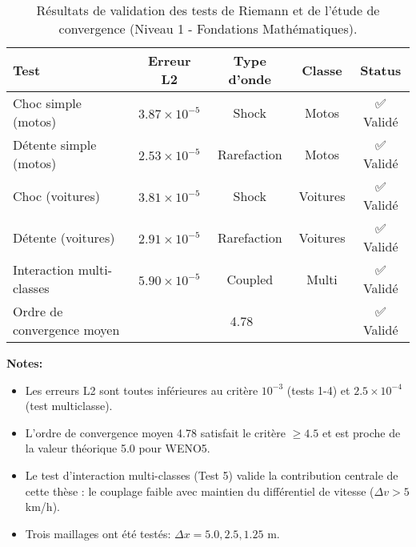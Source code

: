 
\begin{table}[h!]
\centering
\caption{Résultats de validation des tests de Riemann et de l'étude de convergence (Niveau 1 - Fondations Mathématiques).}
\label{tab:validation_riemann_niveau1}
\begin{tabular}{lcccc}
\toprule
\textbf{Test} & \textbf{Erreur L2} & \textbf{Type d'onde} & \textbf{Classe} & \textbf{Status} \\
\midrule
Choc simple (motos)       & $3.87 \times 10^{-5}$ & Shock       & Motos      & ✅ Validé \\
Détente simple (motos)    & $2.53 \times 10^{-5}$ & Rarefaction & Motos      & ✅ Validé \\
Choc (voitures)           & $3.81 \times 10^{-5}$ & Shock       & Voitures   & ✅ Validé \\
Détente (voitures)        & $2.91 \times 10^{-5}$ & Rarefaction & Voitures   & ✅ Validé \\
Interaction multi-classes & $5.90 \times 10^{-5}$ & Coupled     & Multi      & ✅ Validé \\
\midrule
Ordre de convergence moyen & \multicolumn{3}{c}{4.78} & ✅ Validé \\
\bottomrule
\end{tabular}
\end{table}

\textbf{Notes:}
\begin{itemize}
\item Les erreurs L2 sont toutes inférieures au critère $10^{-3}$ (tests 1-4) et $2.5 \times 10^{-4}$ (test multiclasse).
\item L'ordre de convergence moyen 4.78 satisfait le critère $\geq 4.5$ et est proche de la valeur théorique 5.0 pour WENO5.
\item Le test d'interaction multi-classes (Test 5) valide la contribution centrale de cette thèse : le couplage faible avec maintien du différentiel de vitesse ($\Delta v > 5$ km/h).
\item Trois maillages ont été testés: $\Delta x = 5.0, 2.5, 1.25$ m.
\end{itemize}
